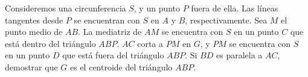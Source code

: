 Consideremos una circunferencia $S$, y un punto $P$ fuera de ella. Las líneas tangentes desde $P$ se encuentran con $S$ en $A$ y $B$, respectivamente. Sea $M$ el punto medio de $AB$. La mediatriz de $AM$ se encuentra con $S$ en un punto $C$ que está dentro del triángulo $ABP$. $AC$ corta a $PM$ en $G$, y $PM$ se encuentra con $S$ en un punto $D$ que está fuera del triángulo $ABP$. Si $BD$ es paralela a $AC$, demostrar que $G$ es el centroide del triángulo $ABP$.
